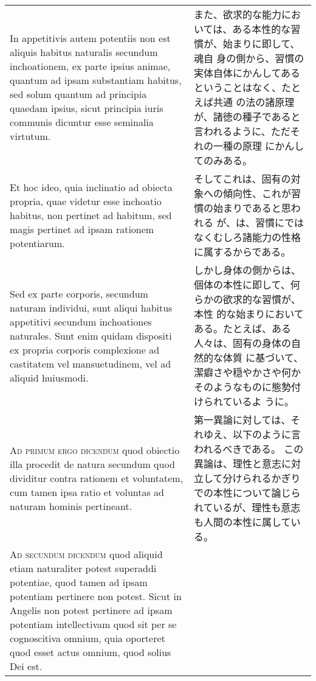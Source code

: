 \documentclass[10pt]{jsarticle} %
\begin{document}
\begin{longtable}{p{21em}p{21em}}
In appetitivis autem potentiis non est aliquis habitus naturalis
secundum inchoationem, ex parte ipsius animae, quantum ad ipsam
substantiam habitus, sed solum quantum ad principia quaedam ipsius,
sicut principia iuris communis dicuntur esse seminalia virtutum.

&

また、欲求的な能力においては、ある本性的な習慣が、始まりに即して、魂自
身の側から、習慣の実体自体にかんしてあるということはなく、たとえば共通
の法の諸原理が、諸徳の種子であると言われるように、ただそれの一種の原理
にかんしてのみある。

\\



Et hoc ideo, quia inclinatio ad obiecta propria, quae videtur esse
inchoatio habitus, non pertinet ad habitum, sed magis pertinet ad
ipsam rationem potentiarum.


&

そしてこれは、固有の対象への傾向性、これが習慣の始まりであると思われる
 が、は、習慣にではなくむしろ諸能力の性格に属するからである。

\\


Sed ex parte corporis, secundum naturam individui, sunt aliqui habitus
appetitivi secundum inchoationes naturales. Sunt enim quidam dispositi
ex propria corporis complexione ad castitatem vel mansuetudinem, vel
ad aliquid huiusmodi.

&

しかし身体の側からは、個体の本性に即して、何らかの欲求的な習慣が、本性
的な始まりにおいてある。たとえば、ある人々は、固有の身体の自然的な体質
に基づいて、潔癖さや穏やかさや何かそのようなものに態勢付けられているよ
うに。

\\


{\scshape Ad primum ergo dicendum} quod obiectio illa procedit de
 natura secundum quod dividitur contra rationem et voluntatem, cum
 tamen ipsa ratio et voluntas ad naturam hominis pertineant.

&

第一異論に対しては、それゆえ、以下のように言われるべきである。
この異論は、理性と意志に対立して分けられるかぎりでの本性について論じら
 れているが、理性も意志も人間の本性に属している。

\\




{\scshape Ad secundum dicendum} quod aliquid etiam naturaliter potest
superaddi potentiae, quod tamen ad ipsam potentiam pertinere non
potest. Sicut in Angelis non potest pertinere ad ipsam potentiam
intellectivam quod sit per se cognoscitiva omnium, quia oporteret quod
esset actus omnium, quod solius Dei est.


\end{longtable}
\end{document}
